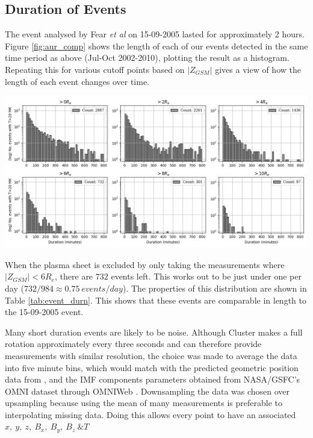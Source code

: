 \documentclass[12pt]{article}
\newenvironment{Figure}
  {\par\medskip\noindent\minipage{\linewidth}}
  {\endminipage\par\medskip}
\begin{document}
\subsection{Duration of Events \label{ssec:DURn}}
The event analysed by Fear \textit{et al} \cite{Fear1506} on 15-09-2005 lasted for approximately 2 hours. Figure \ref{fig:aur_comp} shows the length of each of our events detected in the same time period as above (Jul-Oct 2002-2010), plotting the result as a histogram. Repeating this for various cutoff points based on $|Z_{GSM}|$ gives a view of how the length of each event changes over time. 

\begin{Figure}
    \centering
    \includegraphics[width=\textwidth]{aur_comp.png}
    \label{fig:aur_comp}
\end{Figure}

When the plasma sheet is excluded by only taking the measurements where $|Z_{GSM}|<6R_e$, there are $732$ events left. This works out to be just under one per day ($732/984\approx0.75\ events/day$). The properties of this distribution are shown in Table \ref{tab:event_durn}. This shows that these events are comparable in length to the 15-09-2005 event.

Many short duration events are likely to be noise. Although Cluster makes a full rotation approximately every three seconds and can therefore provide measurements with similar resolution, the choice was made to average the data into five minute bins, which would match with the predicted geometric position data from \cite{cdms}, and the IMF components parameters obtained from NASA/GSFC's OMNI dataset through OMNIWeb \cite{omniData}. Downsampling the data was chosen over upsampling because using the mean of many measurements is preferable to interpolating missing data. Doing this allows every point to have an associated $x,\ y,\ z,\ B_x,\ B_y,\ B_z\ \& T$
\end{document}
